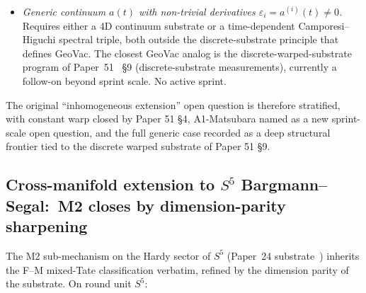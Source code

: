 \documentclass[11pt,a4paper]{article}
\theoremstyle{plain}
\theoremstyle{definition}
\newcommand{\sfive}{S^{5}}
\begin{document}
\begin{itemize}
    The Stefan--Boltzmann $\pi$-injection of Paper~35~\S~III is structurally
    a different extraction --- the Mellin transform at integer $s$ on the
    same product heat kernel, not the small-$t$ SD asymptotic --- and lives
    in the M1$\times$M2 cross-product joint engagement of
    \S\ref{sec:joint}, not in M2 itself.  No conflict.
  \item \textit{Generic continuum $a(t)$ with non-trivial derivatives
    $\varepsilon_i = a^{(i)}(t) \neq 0$.}  Requires either a 4D continuum
    substrate or a time-dependent Camporesi--Higuchi spectral triple, both
    outside the discrete-substrate principle that defines GeoVac.  The
    closest GeoVac analog is the discrete-warped-substrate program of
    Paper~51~\cite{loutey_paper51} \S9 (discrete-substrate measurements), currently a
    follow-on beyond sprint scale.  No active sprint.
\end{itemize}
The original ``inhomogeneous extension'' open question is therefore
stratified, with constant warp closed by Paper 51 \S4, A1-Matsubara
named as a new sprint-scale open question, and the full generic case
recorded as a deep structural frontier tied to the discrete warped
substrate of Paper 51 \S9.

\subsection{Cross-manifold extension to $\sfive$ Bargmann--Segal:\ M2
closes by dimension-parity sharpening}
\label{subsec:open_s5}

The M2 sub-mechanism on the Hardy sector of $\sfive$ (Paper~24
substrate~\cite{loutey_paper24}) inherits the F--M mixed-Tate
classification verbatim, refined by the dimension parity of the
substrate.  On round unit $\sfive$:
\end{document}
